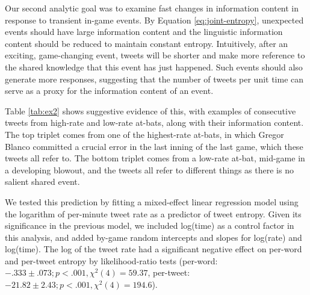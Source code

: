 \documentclass[11pt,letterpaper]{article}
\begin{document}
Our second analytic goal was to examine fast changes in information content in response to transient in-game events. By Equation \ref{eq:joint-entropy}, unexpected events should have large information content and the linguistic information content should be reduced to maintain constant entropy. Intuitively, after an exciting, game-changing event, tweets will be shorter and make more reference to the shared knowledge that this event has just happened. Such events should also generate more responses, suggesting that the number of tweets per unit time can serve as a proxy for the information content of an event.

Table \ref{tab:ex2} shows suggestive evidence of this, with examples of consecutive tweets from high-rate and low-rate at-bats, along with their information content. The top triplet comes from one of the highest-rate at-bats, in which Gregor Blanco committed a crucial error in the last inning of the last game, which these tweets all refer to.  The bottom triplet comes from a low-rate at-bat, mid-game in a developing blowout, and the tweets all refer to different things as there is no salient shared event.


We tested this prediction by fitting a mixed-effect linear regression model using the logarithm of per-minute tweet rate as a predictor of tweet entropy.  Given its significance in the previous model, we included log(time) as a control factor in this analysis, and added by-game random intercepts and slopes for log(rate) and log(time).  The log of the tweet rate had a significant negative effect on per-word and per-tweet entropy by likelihood-ratio tests (per-word: $-.333 \pm .073; p<.001, \chi^2(4)=59.37$, per-tweet: $-21.82 \pm 2.43; p<.001, \chi^2(4)=194.6$). 
\end{document}
